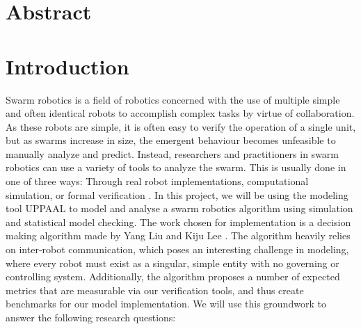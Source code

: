 \section{Abstract}
\section{Introduction}


Swarm robotics is a field of robotics concerned with the use of multiple simple and often identical robots to accomplish complex tasks by virtue of collaboration. As these robots are simple, it is often easy to verify the operation of a single unit, but as swarms increase in size, the emergent behaviour becomes unfeasible to manually analyze and predict. Instead, researchers and practitioners in swarm robotics can use a variety of tools to analyze the swarm. This is usually done in one of three ways: Through real robot implementations, computational simulation, or formal verification \parencite{FisherSwarm2010Original}. In this project, we will be using the modeling tool UPPAAL to model and analyse a swarm robotics algorithm using simulation and statistical model checking. The work chosen for implementation is a decision making algorithm made by Yang Liu and Kiju Lee \parencite{AlgorithmPaper}. The algorithm heavily relies on inter-robot communication, which poses an interesting challenge in modeling, where every robot must exist as a singular, simple entity with no governing or controlling system. Additionally, the algorithm proposes a number of expected metrics that are measurable via our verification tools, and thus create benchmarks for our model implementation. We will use this groundwork to answer the following research questions:


